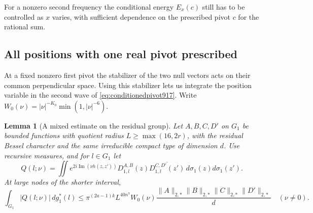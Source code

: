 \documentclass[a4paper,11pt]{article}
\newtheorem{lemma}[proposition]{Lemma}
\theoremstyle{definition}
\theoremstyle{remark}
\numberwithin{equation}{section}
\begin{document}
For a nonzero second frequency the conditional energy
\(E_x(c)\) still has to be controlled as \(x\) varies, with
sufficient dependence on the prescribed pivot \(c\) for
the rational sum.
\clearpage

\subsection{All positions with one real pivot prescribed}
\label{sec:secondallpositions918}

At a fixed nonzero first pivot the stabilizer of the two null
vectors acts on their common perpendicular space. Using this
stabilizer lets us integrate the position variable in the
second wave of \eqref{eq:conditionedpivot917}. Write
\(W_0(\nu)=|\nu|^{-K_0}\min(1,|\nu|^{-6})\).

\begin{lemma}[A mixed estimate on the residual group]
\leavevmode\label{lem:mixedresidual918}
Let \(A,B,C,D'\) on \(G_1\) be bounded functions with quotient
radius \(L\ge\max(16,2r)\), with the residual Bessel character
and the same irreducible compact type of dimension \(d\).
Use recursive measures, and for \(l\in G_1\) let
\[
 Q(l;\nu)=\iint e^{2i\operatorname{Im}(\nu h(z,z'))}
      D_{1,l}^{A,B}(z)\overline{D_{1,l}^{C,D'}(z')}\,
                                    d\sigma_1(z)d\sigma_1(z').
\]
At large nodes of the shorter interval,
\begin{equation}
 \int_{G_1}|Q(l;\nu)|\,dg_1^*(l)
 \le \pi^{(2a-1)k}L^{40n^7} W_0(\nu)
        \frac{\|A\|_{2,*}\|B\|_{2,*}\|C\|_{2,*}\|D'\|_{2,*}}{d}
 \quad(\nu\ne0).
 \label{eq:mixedresidual918}
\end{equation}
\end{lemma}
\end{document}
